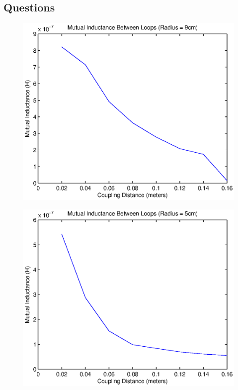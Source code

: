 \documentclass{article}
\begin{document}
\subsection{Questions}
\begin{multicols}{2}
\setlength{\premulticols}{1pt}
\setlength{\postmulticols}{1pt}
\setlength{\multicolsep}{1pt}
\setlength{\columnsep}{2pt}
	
	\begin{figure}[H]
	\centering
   		\includegraphics[scale=0.66]{./Matlab/9cm.eps}
	\end{figure}
	\begin{figure}[H]
	\centering
		\includegraphics[scale=0.66]{./Matlab/5cm.eps}
	
	\end{figure}
\end{multicols}
\end{document}
